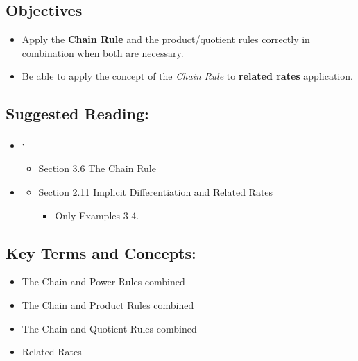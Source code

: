 \vspace{-0.25 in}
\begin{framed}
\subsection*{Objectives}
\begin{itemize}
    \item Apply the \textbf{Chain Rule} and the product/quotient rules correctly in combination when both are necessary.
    \item Be able to apply the concept of the \emph{Chain Rule} to \textbf{related rates} application.
\end{itemize}

\subsection*{Suggested Reading:}
\begin{itemize}
\item \cite{openstax}\footnotemark[1]\textsuperscript{,}\footnotemark[2]
    \begin{itemize}
        \item Section 3.6 The Chain Rule

    \end{itemize}
\item \cite{Calaway}\footnotemark[3]
   \begin{itemize}
         \item Section 2.11 Implicit Differentiation and Related Rates
        \begin{itemize}
            \item Only Examples 3-4.
        \end{itemize}
        
    \end{itemize}


\end{itemize}
\subsection*{Key Terms and Concepts:} 

\begin{multicols}{2}
\begin{itemize}
    \item The Chain and Power Rules combined
    \item The Chain and Product Rules combined
    \item The Chain and Quotient Rules combined
    \item Related Rates
\end{itemize}
\end{multicols}
\end{framed}
